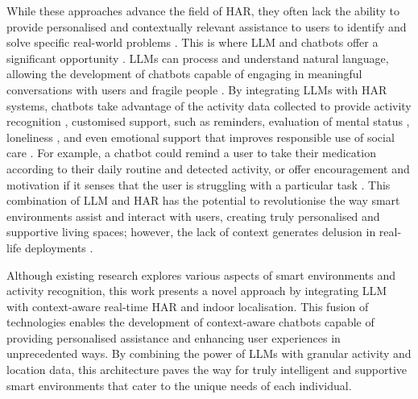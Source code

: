 While these approaches advance the field of HAR, they often lack the ability to provide personalised and contextually relevant assistance to users to identify and solve specific real-world problems \cite{diraco2023review}. This is where LLM and chatbots offer a significant opportunity \cite{miura2022assisting,valtolina2021charlie}. LLMs can process and understand natural language, allowing the development of chatbots capable of engaging in meaningful conversations with users and fragile people \cite{yaser2024rag}. By integrating LLMs with HAR systems, chatbots take advantage of the activity data collected to provide activity recognition \cite{cleland2024leveraging}, customised support, such as reminders, evaluation of mental status \cite{hristidis2023chatgpt}, loneliness \cite{yangai}, and even emotional support \cite{alessa2023towards} that improves responsible use of social care \cite{emmer2024defining}. For example, a chatbot could remind a user to take their medication according to their daily routine and detected activity, or offer encouragement and motivation if it senses that the user is struggling with a particular task \cite{alessa2023towards}. This combination of LLM and HAR has the potential to revolutionise the way smart environments assist and interact with users, creating truly personalised and supportive living spaces; however, the lack of context generates delusion in real-life deployments \cite{irfan2023between}.

Although existing research explores various aspects of smart environments and activity recognition, this work presents a novel approach by integrating LLM with context-aware real-time HAR and indoor localisation. This fusion of technologies enables the development of context-aware chatbots capable of providing personalised assistance and enhancing user experiences in unprecedented ways. By combining the power of LLMs with granular activity and location data, this architecture paves the way for truly intelligent and supportive smart environments that cater to the unique needs of each individual.